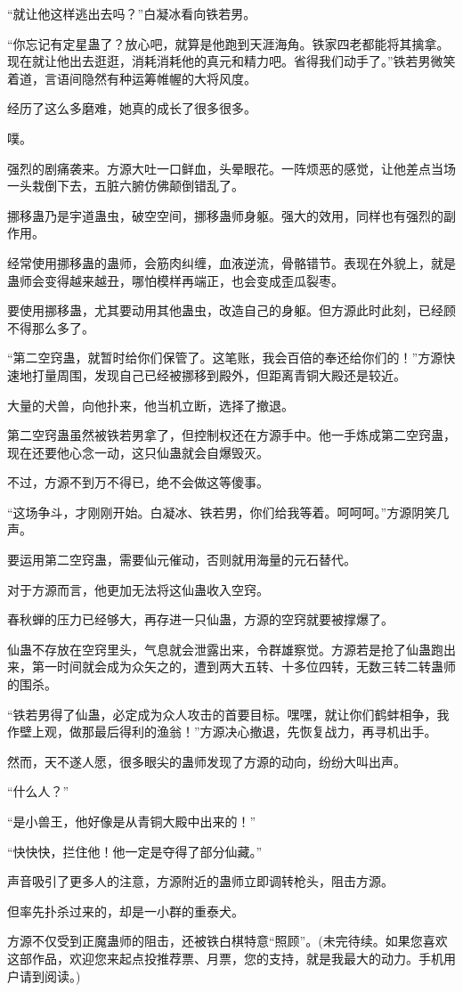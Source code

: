 \begin{this_body}
“就让他这样逃出去吗？”白凝冰看向铁若男。

“你忘记有定星蛊了？放心吧，就算是他跑到天涯海角。铁家四老都能将其擒拿。现在就让他出去逛逛，消耗消耗他的真元和精力吧。省得我们动手了。”铁若男微笑着道，言语间隐然有种运筹帷幄的大将风度。

经历了这么多磨难，她真的成长了很多很多。

噗。

强烈的剧痛袭来。方源大吐一口鲜血，头晕眼花。一阵烦恶的感觉，让他差点当场一头栽倒下去，五脏六腑仿佛颠倒错乱了。

挪移蛊乃是宇道蛊虫，破空空间，挪移蛊师身躯。强大的效用，同样也有强烈的副作用。

经常使用挪移蛊的蛊师，会筋肉纠缠，血液逆流，骨骼错节。表现在外貌上，就是蛊师会变得越来越丑，哪怕模样再端正，也会变成歪瓜裂枣。

要使用挪移蛊，尤其要动用其他蛊虫，改造自己的身躯。但方源此时此刻，已经顾不得那么多了。

“第二空窍蛊，就暂时给你们保管了。这笔账，我会百倍的奉还给你们的！”方源快速地打量周围，发现自己已经被挪移到殿外，但距离青铜大殿还是较近。

大量的犬兽，向他扑来，他当机立断，选择了撤退。

第二空窍蛊虽然被铁若男拿了，但控制权还在方源手中。他一手炼成第二空窍蛊，现在还要他心念一动，这只仙蛊就会自爆毁灭。

不过，方源不到万不得已，绝不会做这等傻事。

“这场争斗，才刚刚开始。白凝冰、铁若男，你们给我等着。呵呵呵。”方源阴笑几声。

要运用第二空窍蛊，需要仙元催动，否则就用海量的元石替代。

对于方源而言，他更加无法将这仙蛊收入空窍。

春秋蝉的压力已经够大，再存进一只仙蛊，方源的空窍就要被撑爆了。

仙蛊不存放在空窍里头，气息就会泄露出来，令群雄察觉。方源若是抢了仙蛊跑出来，第一时间就会成为众矢之的，遭到两大五转、十多位四转，无数三转二转蛊师的围杀。

“铁若男得了仙蛊，必定成为众人攻击的首要目标。嘿嘿，就让你们鹤蚌相争，我作壁上观，做那最后得利的渔翁！”方源决心撤退，先恢复战力，再寻机出手。

然而，天不遂人愿，很多眼尖的蛊师发现了方源的动向，纷纷大叫出声。

“什么人？”

“是小兽王，他好像是从青铜大殿中出来的！”

“快快快，拦住他！他一定是夺得了部分仙藏。”

声音吸引了更多人的注意，方源附近的蛊师立即调转枪头，阻击方源。

但率先扑杀过来的，却是一小群的重泰犬。

方源不仅受到正魔蛊师的阻击，还被铁白棋特意“照顾”。(未完待续。如果您喜欢这部作品，欢迎您来起点投推荐票、月票，您的支持，就是我最大的动力。手机用户请到阅读。)

\end{this_body}

